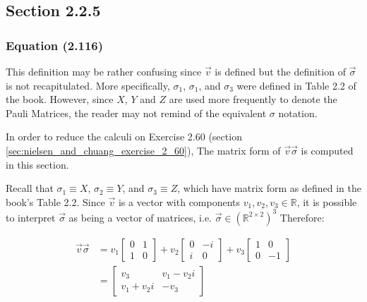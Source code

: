 \subsection{Section 2.2.5}
\subsubsection{Equation (2.116)}
\label{sec:nielsen_and_chuang_equation_2_116}

This definition may be rather confusing since $\vec{v}$ is defined
but the definition of $\vec{\sigma}$ is not recapitulated.
More specifically, $\sigma_1$, $\sigma_1$, and $\sigma_3$ were
defined in Table 2.2 of the book.
However, since $X$, $Y$ and $Z$ are used more frequently to
denote the Pauli Matrices, the reader may not remind of the
equivalent $\sigma$ notation.

In order to reduce the calculi on Exercise 2.60
(section \ref{sec:nielsen_and_chuang_exercise_2_60}),
The matrix form of $\vec{v} \vec{\sigma}$ is computed in this section.

Recall that $\sigma_1 \equiv X$, $\sigma_2 \equiv Y$,
and $\sigma_3 \equiv Z$, which have matrix form as defined in
the book's Table 2.2.
Since $\vec{v}$ is a vector with components
$v_1, v_2, v_3 \in \mathbb{R}$,
it is possible to interpret $\vec{\sigma}$ as being a vector of
matrices, i.e. $\vec{\sigma} \in (\mathbb{R}^{2 \times 2})^3$
Therefore:

\begin{align}
    \vec{v} \vec{\sigma} &= v_1 \left[ \begin{matrix}
        0 & 1 \\ 1 & 0 \end{matrix}\right] +
        v_2 \left[ \begin{matrix}
        0 & -i \\ i & 0 \end{matrix} \right] +
        v_3 \left[ \begin{matrix}
        1 & 0 \\ 0 & -1\end{matrix} \right]
        \\
        &= \left[ \begin{matrix}
        v_3 & v_1 -v_2 i \\ v_1 + v_2 i & - v_3
        \end{matrix} \right]
\end{align}

